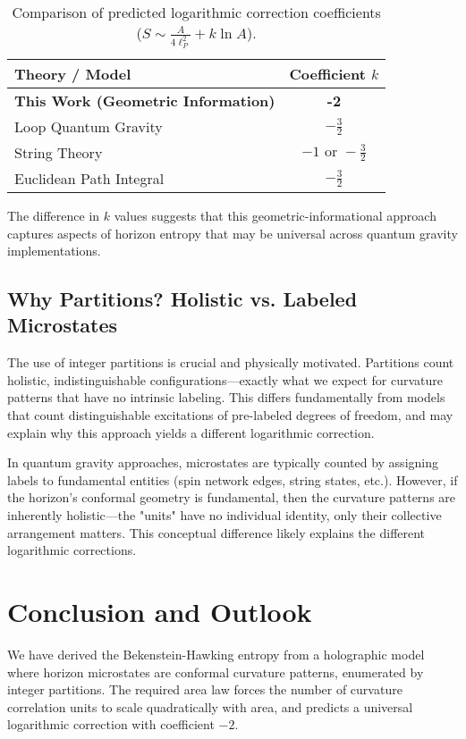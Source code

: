 \documentclass[12pt, letterpaper]{article}
\begin{document}
\begin{table}[h!]
\centering
\caption{Comparison of predicted logarithmic correction coefficients ($S \sim \frac{A}{4\ell_P^2} + k \ln A$).}
\label{tab:comparison}
\begin{tabular}{lc}
\toprule
\textbf{Theory / Model} & \textbf{Coefficient $k$} \\
\midrule
\textbf{This Work (Geometric Information)} & \textbf{-2} \\
Loop Quantum Gravity \cite{kaul2000} & $-\frac{3}{2}$ \\
String Theory \cite{sen2012} & $-1 \text{ or } -\frac{3}{2}$ \\
Euclidean Path Integral & $-\frac{3}{2}$ \\
\bottomrule
\end{tabular}
\end{table}

The difference in $k$ values suggests that this geometric-informational approach captures aspects of horizon entropy that may be universal across quantum gravity implementations.

\subsection{Why Partitions? Holistic vs. Labeled Microstates}
The use of integer partitions is crucial and physically motivated. Partitions count holistic, indistinguishable configurations—exactly what we expect for curvature patterns that have no intrinsic labeling. This differs fundamentally from models that count distinguishable excitations of pre-labeled degrees of freedom, and may explain why this approach yields a different logarithmic correction.

In quantum gravity approaches, microstates are typically counted by assigning labels to fundamental entities (spin network edges, string states, etc.). However, if the horizon's conformal geometry is fundamental, then the curvature patterns are inherently holistic—the "units" have no individual identity, only their collective arrangement matters. This conceptual difference likely explains the different logarithmic corrections.

\section{Conclusion and Outlook}
\label{sec:conclusion}

We have derived the Bekenstein-Hawking entropy from a holographic model where horizon microstates are conformal curvature patterns, enumerated by integer partitions. The required area law forces the number of curvature correlation units to scale quadratically with area, and predicts a universal logarithmic correction with coefficient $-2$.
\end{document}
